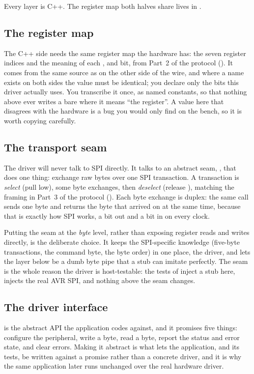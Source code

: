 \noindent Every layer is C++. The register map both halves share lives in
.

\subsection{The register map}
\label{c6:sec:register_map}
The C++ side needs the same register map the hardware has: the seven register indices and the
meaning of each ,  and  bit, from Part~2 of the protocol
(). It comes from the same source as  on the other side of
the wire, and where a name exists on both sides the value must be identical; you declare only the
bits this driver actually uses. You transcribe it once, as named constants, so that nothing above
ever writes a bare  where it means ``the  register''. A value here that
disagrees with the hardware is a bug you would only find on the bench, so it is worth copying
carefully.

\subsection{The transport seam}
\label{c6:sec:transport_seam}
The driver will never talk to SPI directly. It talks to an abstract seam,
, that does one thing: exchange raw bytes over one SPI
transaction. A transaction is \emph{select} (pull  low), some byte exchanges, then
\emph{deselect} (release ), matching the framing in Part~3 of the protocol
(). Each byte exchange is duplex: the same call sends one byte and returns the
byte that arrived on  at the same time, because that is exactly how SPI works, a bit out
and a bit in on every clock.

Putting the seam at the \emph{byte} level, rather than exposing register reads and writes directly,
is the deliberate choice. It keeps the SPI-specific knowledge (five-byte transactions, the command
byte, the byte order) in one place, the driver, and lets the layer below be a dumb byte pipe that a
stub can imitate perfectly. The seam is the whole reason the driver is host-testable: the tests of
 inject a stub here,  injects the real AVR SPI, and nothing above the seam
changes.

\subsection{The driver interface}
\label{c6:sec:driver_interface}
 is the abstract API the application codes against, and it promises
five things: configure the peripheral, write a byte, read a byte, report the status and error
state, and clear errors. Making it abstract is what lets the application, and its tests, be written
against a promise rather than a concrete driver, and it is why the same application later runs
unchanged over the real hardware driver.

